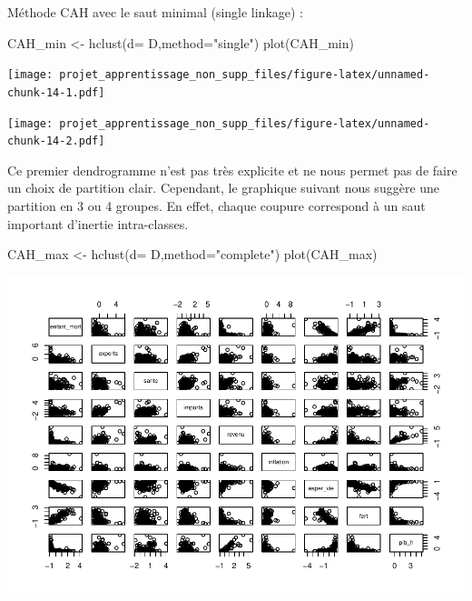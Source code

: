 \documentclass[
]{article}
\newenvironment{Shaded}{\begin{snugshade}}{\end{snugshade}}
\newcommand{\AttributeTok}[1]{\textcolor[rgb]{0.77,0.63,0.00}{#1}}
\newcommand{\FunctionTok}[1]{\textcolor[rgb]{0.00,0.00,0.00}{#1}}
\newcommand{\NormalTok}[1]{#1}
\newcommand{\OtherTok}[1]{\textcolor[rgb]{0.56,0.35,0.01}{#1}}
\newcommand{\SpecialCharTok}[1]{\textcolor[rgb]{0.00,0.00,0.00}{#1}}
\newcommand{\StringTok}[1]{\textcolor[rgb]{0.31,0.60,0.02}{#1}}
\begin{document}
Méthode CAH avec le saut minimal (single linkage) :

\begin{Shaded}
\begin{Highlighting}[]
\NormalTok{CAH\_min }\OtherTok{\textless{}{-}} \FunctionTok{hclust}\NormalTok{(}\AttributeTok{d=}\NormalTok{ D,}\AttributeTok{method=}\StringTok{"single"}\NormalTok{)}
\FunctionTok{plot}\NormalTok{(CAH\_min)}
\end{Highlighting}
\end{Shaded}

\texttt{[image: projet\_apprentissage\_non\_supp\_files/figure-latex/unnamed-chunk-14-1.pdf]}

\begin{Shaded}
\end{Shaded}

\texttt{[image: projet\_apprentissage\_non\_supp\_files/figure-latex/unnamed-chunk-14-2.pdf]}

Ce premier dendrogramme n'est pas très explicite et ne nous permet pas
de faire un choix de partition clair. Cependant, le graphique suivant
nous suggère une partition en 3 ou 4 groupes. En effet, chaque coupure
correspond à un saut important d'inertie intra-classes.

\begin{Shaded}
\begin{Highlighting}[]
\NormalTok{CAH\_max }\OtherTok{\textless{}{-}} \FunctionTok{hclust}\NormalTok{(}\AttributeTok{d=}\NormalTok{ D,}\AttributeTok{method=}\StringTok{"complete"}\NormalTok{)}
\FunctionTok{plot}\NormalTok{(CAH\_max)}
\end{Highlighting}
\end{Shaded}

\includegraphics{projet_apprentissage_non_supp_files/figure-latex/unnamed-chunk-15-1.pdf}
\end{document}
